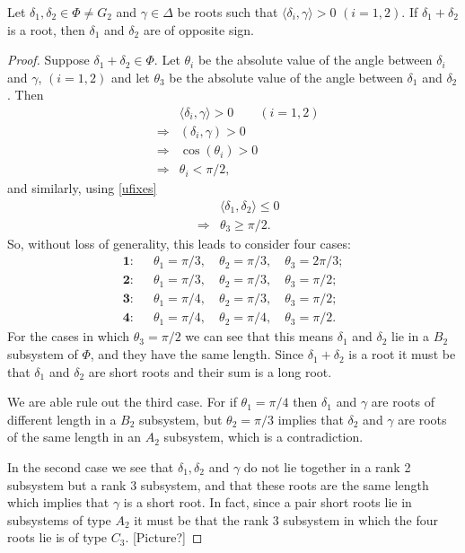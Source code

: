 \begin{lemma} \label{uabelian}
Let $\delta_1, \delta_2 \in \Phi \neq G_2$ and $\gamma \in \Delta$ be roots such that $\langle \delta_i, \gamma \rangle > 0$ $(i = 1, 2)$. If $\delta_1 + \delta_2$ is a root, then $\delta_1$ and $\delta_2$ are of opposite sign.
\end{lemma}
\begin{proof}
Suppose $\delta_1 + \delta_2 \in \Phi$. Let $\theta_i$ be the absolute value of the angle between $\delta_i$ and $\gamma$, $(i = 1,2)$ and let $\theta_3$ be the absolute value of the angle between $\delta_1$ and $\delta_2$. Then
\begin{eqnarray*}
&& \langle \delta_i, \gamma\rangle > 0 \qquad (i=1,2) \\
& \Longrightarrow& (\delta_i, \gamma) > 0 \\
& \Longrightarrow& \cos(\theta_i) > 0 \\
& \Longrightarrow& \theta_i < \pi/2,
\end{eqnarray*}
and similarly, using \ref{ufixes}
\begin{eqnarray*}
&& \langle \delta_1, \delta_2 \rangle \leq 0 \\
& \Longrightarrow& \theta_3 \geq \pi/2.
\end{eqnarray*}
So, without loss of generality, this leads to consider four cases:
\begin{eqnarray*}
\textbf{1:}&&\theta_1 = \pi/3,\quad\theta_2 = \pi/3,\quad\theta_3 = 2\pi/3; \\
\textbf{2:}&&\theta_1 = \pi/3,\quad\theta_2 = \pi/3,\quad\theta_3 = \pi/2; \\
\textbf{3:}&&\theta_1 = \pi/4,\quad\theta_2 = \pi/3,\quad\theta_3 = \pi/2; \\
\textbf{4:}&&\theta_1 = \pi/4,\quad\theta_2 = \pi/4,\quad\theta_3 = \pi/2.
\end{eqnarray*}
For the cases in which $\theta_3 = \pi/2$ we can see that this means $\delta_1$ and $\delta_2$ lie in a $B_2$ subsystem of $\Phi$, and they have the same length. Since $\delta_1+\delta_2$ is a root it must be that $\delta_1$ and $\delta_2$ are short roots and their sum is a long root. 

We are able rule out the third case. For if $\theta_1 = \pi/4$ then $\delta_1$ and $\gamma$ are roots of different length in a $B_2$ subsystem, but $\theta_2 = \pi/3$ implies that $\delta_2$ and $\gamma$ are roots of the same length in an $A_2$ subsystem, which is a contradiction.

In the second case we see that $\delta_1, \delta_2$ and $\gamma$ do not lie together in a rank 2 subsystem but a rank 3 subsystem, and that these roots are the same length which implies that $\gamma$ is a short root. In fact, since a pair short roots lie in subsystems of type $A_2$ it must be that the rank 3 subsystem in which the four roots lie is of type $C_3$. [Picture?]



\end{proof}
